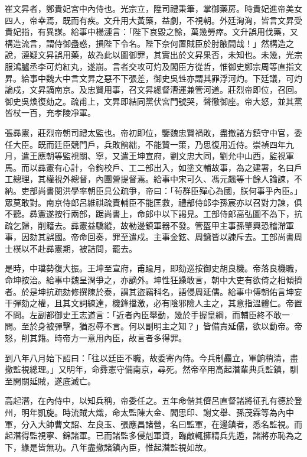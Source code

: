 \begin{pinyinscope}
崔文昇者，鄭貴妃宮中內侍也。光宗立，陞司禮秉筆，掌御藥房。時貴妃進帝美女四人，帝幸焉，既而有疾。文升用大黃藥，益劇，不視朝。外廷洶洶，皆言文昇受貴妃指，有異謀。給事中楊漣言：「陛下哀毀之餘，萬幾勞瘁。文升誤用伐藥，又構造流言，謂侍御蠱惑，損陛下令名。陛下奈何置賊臣於肘腋間哉！」然構造之說，漣疑文昇誤用藥，故為此以圖御罪，其實出於文昇果否，未知也。未幾，光宗服鴻臚丞李可灼紅丸，遂崩。言者交攻可灼及閣臣方從哲，惟御史鄭宗周等直指文昇。給事中魏大中言文昇之惡不下張差，御史吳甡亦謂其罪浮河灼。下廷議，可灼論戍，文昇謫南京。及忠賢用事，召文昇總督漕運兼管河道。莊烈帝即位，召回。御史吳煥復劾之。疏甫上，文昇即結同黨伏宮門號哭，聲徹御座。帝大怒，並其黨皆杖一百，充孝陵凈軍。

張彞憲，莊烈帝朝司禮太監也。帝初即位，鑒魏忠賢禍敗，盡撤諸方鎮守中官，委任大臣。既而廷臣競門戶，兵敗餉絀，不能贊一策，乃思復用近侍。崇禎四年九月，遣王應朝等監視關、寧，又遣王坤宣府，劉文忠大同，劉允中山西，監視軍馬。而以彞憲有心計，令鉤校戶、工二部出入，如塗文輔故事，為之建署，名曰戶工總理，其權視外總督，內團營提督焉。給事中宋可久、馮元飆等十餘人論諫，不納。吏部尚書閔洪學率朝臣具公疏爭，帝曰：「茍群臣殫心為國，朕何事乎內臣。」眾莫敢對。南京侍郎呂維祺疏責輔臣不能匡救，禮部侍郎李孫宸亦以召對力諫，俱不聽。彞憲遂按行兩部，踞尚書上，命郎中以下謁見。工部侍郎高弘圖不為下，抗疏乞歸，削籍去。彞憲益驕縱，故勒邊鎮軍器不發。管盔甲主事孫肇興恐稽滯軍事，因劾其誤國。帝命回奏，罪至遣戍。主事金鉉、周鑣皆以諫斥去。工部尚書周士樸以不赴彞憲期，被詰問，罷去。

是時，中璫勢復大振。王坤至宣府，甫踰月，即劾巡按御史胡良機。帝落良機職，命坤按治。給事中魏呈潤爭之，亦謫外。坤性狂躁敢言，朝中大吏有欲倚之相傾擠者。於是坤抗疏劾修撰陳於泰，謂其盜竊科名，語侵周延儒。給事中傅朝佑言坤妄干彈劾之權，且其文詞練達，機鋒擋激，必有陰邪險人主之，其意指溫體仁。帝置不問。左副都御史王志道言：「近者內臣舉動，幾於手握皇綱，而輔臣終不敢一問。至於身被彈擊，猶忍辱不言。何以副明主之知？」皆備責延儒，欲以動帝。帝怒，削其籍。時帝方一意用內臣，故言者多得罪。

到八年八月始下詔曰：「往以廷臣不職，故委寄內侍。今兵制麤立，軍餉稍清，盡撤監視總理。」又明年，命彞憲守備南京，尋死。然帝卒用高起潛輩典兵監鎮，馴至開關延賊，遂底滅亡。

高起潛，在內侍中，以知兵稱，帝委任之。五年命偕其儕呂直督諸將征孔有德於登州，明年凱旋。時流賊大熾，命太監陳大金、閻思印、謝文舉、孫茂霖等為內中軍，分入大帥曹文詔、左良玉、張應昌諸營，名曰監軍，在邊鎮者，悉名監視。而起潛得監視寧、錦諸軍。已而諸監多侵剋軍資，臨敵輒擁精兵先遁，諸將亦恥為之下，緣是皆無功。八年盡撤諸鎮內臣，惟起潛監視如故。


\end{pinyinscope}
